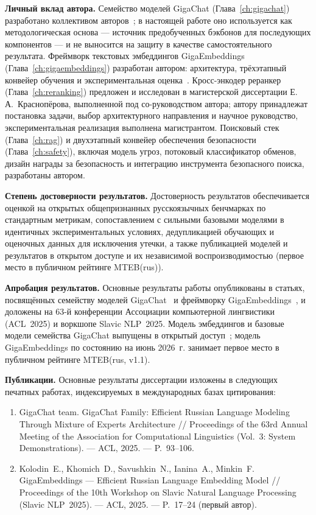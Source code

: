 \textbf{Личный вклад автора.} Семейство моделей GigaChat (Глава~\ref{ch:gigachat}) разработано коллективом авторов~\cite{2506.09440}; в настоящей работе оно используется как методологическая основа --- источник предобученных бэкбонов для последующих компонентов --- и не выносится на защиту в качестве самостоятельного результата. Фреймворк текстовых эмбеддингов GigaEmbeddings (Глава~\ref{ch:gigaembeddings}) разработан автором: архитектура, трёхэтапный конвейер обучения и экспериментальная оценка~\cite{2510.22369}. Кросс-энкодер реранкер (Глава~\ref{ch:reranking}) предложен и исследован в магистерской диссертации Е.\,А.~Краснопёрова, выполненной под со-руководством автора; автору принадлежат постановка задачи, выбор архитектурного направления и научное руководство, экспериментальная реализация выполнена магистрантом. Поисковый стек (Глава~\ref{ch:rag}) и двухэтапный конвейер обеспечения безопасности (Глава~\ref{ch:safety}), включая модель угроз, потоковый классификатор обменов, дизайн награды за безопасность и интеграцию инструмента безопасного поиска, разработаны автором.

\textbf{Степень достоверности результатов.} Достоверность результатов обеспечивается оценкой на открытых общепризнанных русскоязычных бенчмарках по стандартным метрикам, сопоставлением с сильными базовыми моделями в идентичных экспериментальных условиях, дедупликацией обучающих и оценочных данных для исключения утечки, а также публикацией моделей и результатов в открытом доступе и их независимой воспроизводимостью (первое место в публичном рейтинге MTEB(rus)).

\textbf{Апробация результатов.} Основные результаты работы опубликованы в статьях, посвящённых семейству моделей GigaChat~\cite{2506.09440} и фреймворку GigaEmbeddings~\cite{2510.22369}, и доложены на 63-й конференции Ассоциации компьютерной лингвистики (ACL~2025) и воркшопе Slavic NLP~2025. Модель эмбеддингов и базовые модели семейства GigaChat выпущены в открытый доступ~\cite{gigaembeddings_hf,gigachat3_10b}; модель GigaEmbeddings по состоянию на июнь 2026~г. занимает первое место в публичном рейтинге MTEB(rus, v1.1).

\textbf{Публикации.} Основные результаты диссертации изложены в следующих печатных работах, индексируемых в международных базах цитирования:
\begin{enumerate}
    \item GigaChat team. GigaChat Family: Efficient Russian Language Modeling Through Mixture of Experts Architecture // Proceedings of the 63rd Annual Meeting of the Association for Computational Linguistics (Vol.~3: System Demonstrations). --- ACL, 2025. --- P.~93--106.
    \item Kolodin~E., Khomich~D., Savushkin~N., Ianina~A., Minkin~F. GigaEmbeddings --- Efficient Russian Language Embedding Model // Proceedings of the 10th Workshop on Slavic Natural Language Processing (Slavic NLP~2025). --- ACL, 2025. --- P.~17--24 (первый автор).
\end{enumerate}

